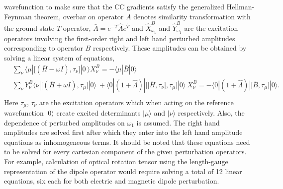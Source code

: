 wavefunction to make sure that the CC gradients satisfy the 
generalized Hellman-Feynman theorem\cite{Koch90}, overbar on operator $A$ denotes similarity transformation with the ground state
$T$ operator, $\bar{A} = e^{-\hat{T}}\hat{A}e^{\hat{T}}$
and $\hat{X}^{B}_{\omega_1}$ and $\hat{Y}^{B}_{\omega_1}$ are the excitation operators involving the first-order right and left hand perturbed amplitudes corresponding to operator $B$ respectively. These amplitudes can be obtained by solving a linear system of equations,
\begin{equation}
\begin{split}
&\sum_\nu\langle \mu | \big[(\bar{H} - \omega I),\tau_\nu\big] |0 \
\rangle X_{\nu}^{B} = -\langle \mu|\bar{B}|0 \rangle \\
&\sum_\nu Y_{\nu}^{B}\langle \nu | \big[(\bar{H} + \omega I),\tau_\mu\big] |0 \rangle \
+ \langle 0|(1 + \hat{\Lambda})|\big[\big[\bar{H},\tau_\nu\big],\tau_\mu\big] |0 \rangle\  X_{\nu}^{B}
= -\langle 0|(1 + \hat{\Lambda})|\big[\bar{B},\tau_\mu\big] |0 \rangle .\\
\end{split}
\label{Eq:first_pert_amp}
\end{equation}
Here $\tau_\mu$, $\tau_\nu$ are the excitation operators which when acting on the reference wavefunction $|0\rangle$ create excited determinants $|\mu\rangle$ 
and $|\nu\rangle$ respectively. Also, the dependence of perturbed amplitudes
 on $\omega_1$ is assumed. The right hand amplitudes are solved first after 
which they enter into the left hand amplitude equations as inhomogeneous terms. 
It should be noted that these equations need to be solved for every cartesian 
component of the given perturbation operators. For example, calculation of 
optical rotation tensor using the length-gauge representation of the dipole 
operator would require solving a total of 12 linear equations, six each 
for both electric and magnetic dipole perturbation.
